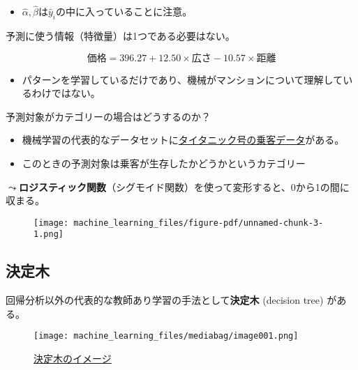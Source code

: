 \documentclass[
  xelatex,
  ja=standard]{bxjsarticle}
\providecommand{\tightlist}{%
  \setlength{\itemsep}{0pt}\setlength{\parskip}{0pt}}\usepackage{longtable,booktabs,array}
\begin{document}
\begin{itemize}
\tightlist
\item
  \(\hat{\alpha}, \hat{\beta}\)は\(\hat{y}_i\)の中に入っていることに注意。
\end{itemize}

予測に使う情報（特徴量）は1つである必要はない。

\[
価格 = 396.27 + 12.50 \times 広さ -10.57 \times 距離
\]

\begin{itemize}
\tightlist
\item
  パターンを学習しているだけであり、機械がマンションについて理解しているわけではない。
\end{itemize}

予測対象がカテゴリーの場合はどうするのか？

\begin{itemize}
\tightlist
\item
  機械学習の代表的なデータセットに\href{https://www.kaggle.com/competitions/titanic}{タイタニック号の乗客データ}がある。
\item
  このときの予測対象は乗客が生存したかどうかというカテゴリー
\end{itemize}

\(\leadsto\)\textbf{ロジスティック関数}（シグモイド関数）を使って変形すると、0から1の間に収まる。

\begin{figure}[htpb]

{\centering \texttt{[image: machine\_learning\_files/figure-pdf/unnamed-chunk-3-1.png]}

}

\end{figure}

\hypertarget{ux6c7aux5b9aux6728}{%
\subsection{決定木}\label{ux6c7aux5b9aux6728}}

回帰分析以外の代表的な教師あり学習の手法として\textbf{決定木} (decision
tree) がある。

\begin{figure}[htpb]

{\centering \texttt{[image: machine\_learning\_files/mediabag/image001.png]}

}

\caption{\href{https://www.nttcoms.com/service/research/dataanalysis/decision-tree/}{決定木のイメージ}}

\end{figure}
\end{document}
